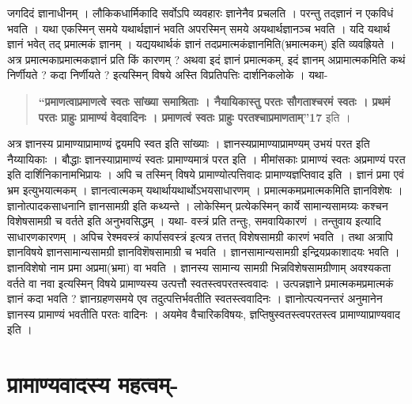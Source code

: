 जगदिदं ज्ञानाधीनम् । लौकिकधार्मिकादि सर्वोऽपि व्यवहारः ज्ञानेनैव प्रचलति । परन्तु तद्ज्ञानं न एकविधं भवति । यथा एकस्मिन् समये यथार्थज्ञानं भवति अपरस्मिन् समये अयथार्थज्ञानञ्च भवति । यदि यथार्थ ज्ञानं भवेत् तद् प्रमात्मकं ज्ञानम् । यद्ययथार्थकं ज्ञानं तदप्रमात्मकंज्ञानमिति(भ्रमात्मकम्) इति व्यवह्रियते । अत्र प्रमात्मकाप्रमात्मकज्ञानं प्रति किं कारणम् ? अथवा इदं ज्ञानं प्रमात्मकम्, इदं ज्ञानम् अप्रामात्मकमिति कथं निर्णीयते ? कदा निर्णीयते ? इत्यस्मिन् विषये अस्ति विप्रतिपत्तिः दार्शनिकलोके । यथा-
\begin{verse}
\textbf{“प्रमाणत्वाप्रमाणत्वे स्वतः सांख्या समाश्रिताः ।
नैयायिकास्तु परतः सौगताश्चरमं स्वतः ।
प्रथमं परतः प्राहुः प्रामाण्यं वेदवादिनः ।
प्रमाणत्वं स्वतः प्राहुः परतश्चाप्रमाणताम्”17} इति ।
\end{verse}
अत्र ज्ञानस्य प्रामाण्याप्रामाण्यं द्वयमपि स्वत इति सांख्याः । ज्ञानस्यप्रामाण्याप्रामण्यम् उभयं परत इति नैय्यायिकाः । बौद्धाः ज्ञानस्याप्रामाण्यं स्वतः प्रामाण्यमात्रं परत इति । मीमांसकाः प्रामाण्यं स्वतः अप्रमाण्यं परत इति दार्शिनिकानामभिप्रायः । अपि च तस्मिन् विषये प्रामाण्योत्पत्तिवादः प्रामाण्यज्ञप्तिवाद इति । ज्ञानं प्रमा एवं भ्रम इत्युभयात्मकम् । ज्ञानत्वात्मकम् यथार्थायथार्थोऽभयसाधारणम् । प्रमात्मकमप्रमात्मकमिति ज्ञानविशेषः । ज्ञानोत्पादकसाधनानि ज्ञानसामग्री इति कथ्यन्ते । लोकेस्मिन् प्रत्येकस्मिन् कार्ये सामान्यसामग्र्यः कश्चन विशेषसामग्री च वर्तते इति अनुभवसिद्धम् । यथा- वस्त्रं प्रति तन्तुः, समवायिकारणं । तन्तुवाय इत्यादि साधारणकारणम् । अपिच रेश्मवस्त्रं कार्पासवस्त्रं इत्यत्र तत्तत् विशेषसामग्री कारणं भवति । तथा अत्रापि ज्ञानविषये ज्ञानसामान्यसामग्री ज्ञानविशॆषसामाग्री च भवति । ज्ञानसामान्यसामग्री इन्द्रियप्रकाशादयः भवति । ज्ञानविशेषो नाम प्रमा अप्रमा(भ्रमा) वा भवति । ज्ञानस्य सामान्य सामग्री भिन्नविशेषसामग्रीणाम् अवश्यकता वर्तते वा नवा इत्यस्मिन् विषये प्रामाण्यस्य उत्पत्तौ स्वतस्त्वपरतस्त्ववादः । उत्पन्नज्ञाने प्रमात्मकमप्रमात्मकं ज्ञानं कदा भवति ? ज्ञानग्रहणसमये एव तदुत्पत्तिर्भवतीति स्वतस्त्ववादिनः । ज्ञानोत्पत्यनन्तरं अनुमानेन ज्ञानस्य प्रामाण्यं भवतीति परतः वादिनः । अयमेव वैचारिकविषयः, ज्ञप्तिषुस्वतस्त्वपरतस्त्व प्रामाण्याप्राण्यवाद इति ।

\section*{प्रामाण्यवादस्य महत्वम्-}

